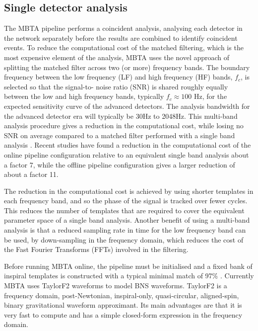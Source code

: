 \documentclass[aps, prd, twocolumn, superscriptaddress, nofootinbib]{revtex4-1}
\begin{document}
\subsection{Single detector analysis}

The MBTA pipeline performs a coincident analysis, analysing each detector in the network separately before the results are combined to identify coincident events. To reduce the computational cost of the matched filtering, which is the most expensive element of the analysis, MBTA uses the novel approach of splitting the matched filter across two (or more) frequency bands. The boundary frequency between the low frequency (LF) and high frequency (HF) bands, $f_c$, is selected so that the signal-to- noise ratio (SNR) is shared roughly equally between the low and high frequency bands, typically  $f_c \approx 100$ Hz, for the expected sensitivity curve of the advanced detectors. The analysis bandwidth for the advanced detector era will typically be 30Hz to 2048Hz. This multi-band analysis procedure gives a reduction in the computational cost, while losing no SNR on average compared to a matched filter performed with a single band analysis \cite{Marion2003}. Recent studies have found a reduction in the computational cost of the online pipeline configuration relative to an equivalent single band analysis about a factor 7, while the offline pipeline configuration gives a larger reduction of about a factor 11.

The reduction in the computational cost is achieved by using shorter templates in each frequency band, and so the phase of the signal is tracked over fewer cycles. This reduces the number of templates that are required to cover the equivalent parameter space of a single band analysis. Another benefit of using a multi-band analysis is that a reduced sampling rate in time for the low frequency band can be used, by down-sampling in the frequency domain, which reduces the cost of the Fast Fourier Transforms (FFTs) involved in the filtering.

Before running MBTA online, the pipeline must be initialised and a fixed bank of inspiral templates is constructed with a typical minimal match of 97\% \cite{Brown2012}. Currently MBTA uses TaylorF2 waveforms to model BNS waveforms. TaylorF2 is a  frequency domain, post-Newtonian, inspiral-only, quasi-circular, aligned-spin, binary gravitational waveform approximant. Its main advantages are that it is very fast to compute and has a simple closed-form expression in the frequency domain.
\end{document}
